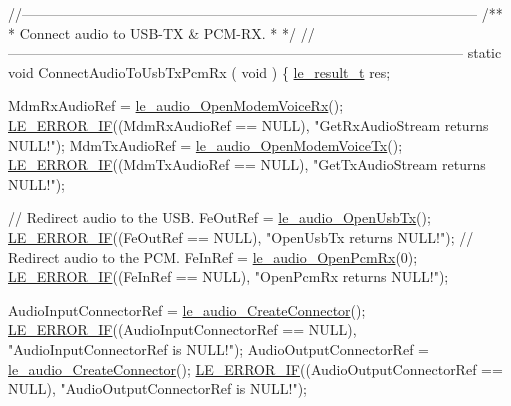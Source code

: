 \begin{DoxyCodeInclude}
{{{{\textcolor{comment}{//--------------------------------------------------------------------------------------------------}\textcolor{comment}{}
\textcolor{comment}{/**}
\textcolor{comment}{ * Connect audio to USB-TX & PCM-RX.}
\textcolor{comment}{ *}
\textcolor{comment}{ */}
\textcolor{comment}{//--------------------------------------------------------------------------------------------------}
\textcolor{keyword}{static} \textcolor{keywordtype}{void} ConnectAudioToUsbTxPcmRx
(
    \textcolor{keywordtype}{void}
)
\{
    \hyperlink{le__basics_8h_a1cca095ed6ebab24b57a636382a6c86c}{le\_result\_t} res;

    MdmRxAudioRef = \hyperlink{le__audio__interface_8h_ae3ed568ba4d2763ea77e17e77b20ff02}{le\_audio\_OpenModemVoiceRx}();
    \hyperlink{le__log_8h_aceaf11a11691d6c676e36dd317b38dbd}{LE\_ERROR\_IF}((MdmRxAudioRef == NULL), \textcolor{stringliteral}{"GetRxAudioStream returns NULL!"});
    MdmTxAudioRef = \hyperlink{le__audio__interface_8h_ad745f008bb04873c817da7af3daf783d}{le\_audio\_OpenModemVoiceTx}();
    \hyperlink{le__log_8h_aceaf11a11691d6c676e36dd317b38dbd}{LE\_ERROR\_IF}((MdmTxAudioRef == NULL), \textcolor{stringliteral}{"GetTxAudioStream returns NULL!"});

    \textcolor{comment}{// Redirect audio to the USB.}
    FeOutRef = \hyperlink{le__audio__interface_8h_adb38f11ac78cf99160c19f69b4db0eb8}{le\_audio\_OpenUsbTx}();
    \hyperlink{le__log_8h_aceaf11a11691d6c676e36dd317b38dbd}{LE\_ERROR\_IF}((FeOutRef == NULL), \textcolor{stringliteral}{"OpenUsbTx returns NULL!"});
    \textcolor{comment}{// Redirect audio to the PCM.}
    FeInRef = \hyperlink{le__audio__interface_8h_aa0f0b5fcab8844c67a936d88fa050cf5}{le\_audio\_OpenPcmRx}(0);
    \hyperlink{le__log_8h_aceaf11a11691d6c676e36dd317b38dbd}{LE\_ERROR\_IF}((FeInRef == NULL), \textcolor{stringliteral}{"OpenPcmRx returns NULL!"});

    AudioInputConnectorRef = \hyperlink{le__audio__interface_8h_a570aaf85086f00aca592acfbaaa237be}{le\_audio\_CreateConnector}();
    \hyperlink{le__log_8h_aceaf11a11691d6c676e36dd317b38dbd}{LE\_ERROR\_IF}((AudioInputConnectorRef == NULL), \textcolor{stringliteral}{"AudioInputConnectorRef is NULL!"});
    AudioOutputConnectorRef = \hyperlink{le__audio__interface_8h_a570aaf85086f00aca592acfbaaa237be}{le\_audio\_CreateConnector}();
    \hyperlink{le__log_8h_aceaf11a11691d6c676e36dd317b38dbd}{LE\_ERROR\_IF}((AudioOutputConnectorRef == NULL), \textcolor{stringliteral}{"AudioOutputConnectorRef is NULL!"});

}}}}
\end{DoxyCodeInclude}

